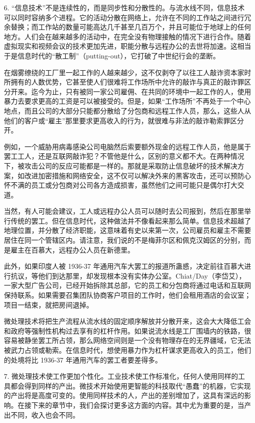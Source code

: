 6. “信息技术”不是连续性的，而是同步性和分散性的。与流水线不同，信息技术可以同时容纳多个进程。它的活动分散在网络上，允许在不同的工作站之间进行冗余替换；而工作站的数量可能高达几千甚至几百万个，并且可能位于地球上的任何地方。人们会在越来越多的活动中，在完全没有物理接触的情况下进行合作。随着虚拟现实和视频会议的技术更加先进，职能分散与远程办公的去世将加速。这相当于是信息时代的“散工制”（putting-out），它打破了中世纪行会的垄断。

在烟雾缭绕的工厂里一起工作的人越来越少，这不仅剥夺了以往工人敲诈资本家时所拥有的人数优势，它甚至使人们很难将工作场所中允许的敲诈与真正的敲诈罪区分开来。迄今为止，只有被同一家公司雇佣、在共同的环境中一起工作的人，使用暴力去要求更高的工资是可以被接受的。但是，如果“工作场所”不再处于一个中心地点，而且公司的大部分只能都分散给了分包商和远程工作人员，那么，这些人从他们的客户或“雇主”那里要求更高收入的行为，就很难与非法的敲诈勒索罪区分开。

例如，一个威胁用病毒感染公司电脑然后索要额外现金的远程工作人员，他是属于罢工工人，还是互联网敲诈犯？不管他是什么，区别的意义都不大。在两种情况下，被攻击公司的反应可能都是一样的。那就是采取防止信息破坏的技术解决方案，如改进加密措施和网络安全，这不仅可以解决外来的黑客攻击，还可以预防心怀不满的员工或分包商对公司各方造成损害，虽然他们之间可能只是偶尔打大交道。

当然，有人可能会建议，工人或远程办公人员可以随时去公司报到，然后在那里举行传统的罢工。但在信息时代，这种做法并不像看起来那么简单。信息技术超越了地理位置，并分散了经济职能，这意味着有史以来第一次，公司雇员和雇主不需要居住在同一个管辖区内。请注意，我们说的不是梅菲尔区和佩克汉姆区的分别，而是雇主在百慕大，远程办公人员在新德里。

此外，如果印度人被 1936-37 年通用汽车大罢工的报道所蛊惑，决定前往百慕大进行抗议，等他们到达那里，却发现根本没有实体办公室。Chiat/Day（李岱艾），一家大型广告公司，已经开始拆除其总部，它的员工和分包商将通过电话和互联网保持联系。如果需要召集团队协商客户项目的工作时，他们会租用酒店的会议室；项目一结束，就把房间退掉。

微处理技术将把生产流程从流水线的固定顺序解放并分散开来，这会大大降低工会和政府等强制性机构过去享有的杠杆作用。如果说流水线是工厂围墙内的铁路，很容易被静坐罢工所占领，那么网络空间则是一个没有物理存在的无界疆域，它无法被武力占领或勒索。在信息时代，想使用暴力作为杠杆谋求更高收入的员工，他们的处境将比 1936-37 年通用汽车的罢工者要差得多。

7. 微处理技术使工作更加个性化。工业技术使工作标准化，任何人使用同样的工具都会得到同样的产出。微技术开始使用更智能的科技取代“愚蠢”的机器，它实现的产出将是高度可变的。使用同样技术的人，产出的差别增加了，这具有深远的影响。在接下来的章节中，我们会探讨更多这方面的内容。其中尤为重要的是，当产出不同，收入也会不同。


